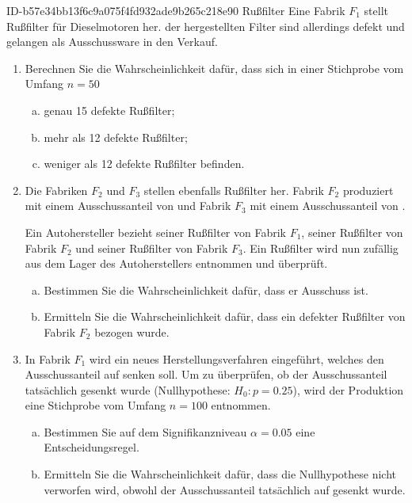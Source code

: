 \begin{exercise}
      {ID-b57e34bb13f6c9a075f4fd932ade9b265c218e90}
      {Rußfilter}
  \ifproblem\problem
    Eine Fabrik $F_{1}$ stellt Rußfilter für Dieselmotoren her.
     der hergestellten Filter sind allerdings defekt und
    gelangen als Ausschussware in den Verkauf.
    \begin{enumerate}[1)]
      \item Berechnen Sie die Wahrscheinlichkeit dafür, dass sich
            in einer Stichprobe vom Umfang $n=50$
            \begin{enumerate}[a)]
              \item genau 15 defekte Rußfilter;
              \item mehr als 12 defekte Rußfilter;
              \item weniger als 12 defekte Rußfilter befinden.
            \end{enumerate}
      \item Die Fabriken $F_{2}$ und $F_{3}$ stellen ebenfalls
            Rußfilter her. Fabrik $F_{2}$ produziert mit einem
            Ausschussanteil von  und Fabrik $F_{3}$ mit
            einem Ausschussanteil von .\par
            Ein Autohersteller bezieht  seiner Rußfilter
            von Fabrik $F_{1}$,  seiner Rußfilter von
            Fabrik $F_{2}$ und  seiner Rußfilter von
            Fabrik $F_{3}$. Ein Rußfilter wird nun zufällig aus
            dem Lager des Autoherstellers entnommen und überprüft.
            \begin{enumerate}[a)]
              \item Bestimmen Sie die Wahrscheinlichkeit dafür,
                    dass er Ausschuss ist.
              \item Ermitteln Sie die Wahrscheinlichkeit dafür,
                    dass ein defekter Rußfilter von Fabrik $F_{2}$
                    bezogen wurde.
            \end{enumerate}
      \item In Fabrik $F_{1}$ wird ein neues Herstellungsverfahren
            eingeführt, welches den Ausschussanteil auf 
            senken soll. Um zu überprüfen, ob der Ausschuss\-anteil
            tatsächlich gesenkt wurde (Nullhypothese: $H_{0}:p=\num{0.25}$),
            wird der Produktion eine Stichprobe vom Umfang $n=100$
            entnommen.
            \begin{enumerate}[a)]
              \item Bestimmen Sie auf dem Signifikanzniveau $\alpha=\num{0.05}$
                    eine Entscheidungsregel.
              \item Ermitteln Sie die Wahrscheinlichkeit dafür,
                    dass die Nullhypothese nicht verworfen wird,
                    obwohl der Ausschussanteil tatsächlich auf 
                    gesenkt wurde.
            \end{enumerate}
    \end{enumerate}
  \fi
\end{exercise}
